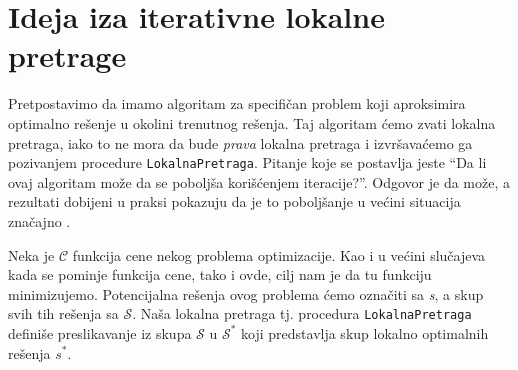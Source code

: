 \documentclass[a4paper]{article}
\newcommand{\q}[1]{``#1''}  %
\newcommand{\s}[0]{\textit{s}} %
\newcommand{\sstar}[0]{$\textit{s}^*$}
\renewcommand{\S}[0]{$\mathcal{S}$} %
\newcommand{\Sstar}[0]{$\mathcal{S}^{*}$}
\newcommand{\lokalna}[0]{\small{\texttt{LokalnaPretraga}}}
\begin{document}








\section{Ideja iza iterativne lokalne pretrage}
Pretpostavimo da imamo algoritam za specifičan problem koji aproksimira optimalno rešenje u okolini trenutnog rešenja. 
Taj algoritam ćemo zvati lokalna pretraga, iako to ne mora da bude \textit{prava} lokalna pretraga i  
izvršavaćemo ga pozivanjem procedure \lokalna{}. Pitanje koje se postavlja jeste \q{Da li 
ovaj algoritam može da se poboljša korišćenjem iteracije?}. Odgovor je da može, a rezultati dobijeni u praksi pokazuju 
da je to poboljšanje u većini situacija značajno \cite{beginnersIntroduction}.\footnotemark
{} 

Neka je $\mathcal{C}$ funkcija cene nekog problema optimizacije. Kao i u većini slučajeva kada se pominje funkcija cene,
tako i ovde, cilj nam je da tu funkciju minimizujemo. Potencijalna rešenja ovog problema ćemo označiti sa \s{}, 
a skup svih tih rešenja sa \S{}. Naša lokalna pretraga tj. procedura \lokalna{} definiše preslikavanje 
iz skupa \S{} u \Sstar{} koji predstavlja skup lokalno optimalnih rešenja \sstar{}.
\end{document}
